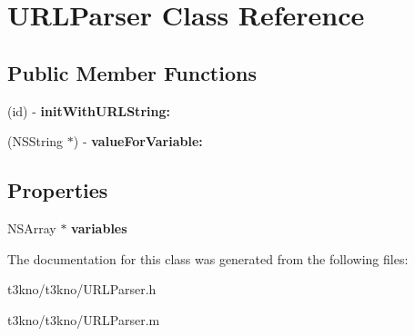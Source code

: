 \hypertarget{interface_u_r_l_parser}{\section{U\-R\-L\-Parser Class Reference}
\label{interface_u_r_l_parser}
}
\subsection*{Public Member Functions}
\begin{DoxyCompactItemize}
\item 
\hypertarget{interface_u_r_l_parser_a6e0ce77bf25aa5385addcae4a1017cc5}{(id) -\/ {\bfseries init\-With\-U\-R\-L\-String\-:}}\label{interface_u_r_l_parser_a6e0ce77bf25aa5385addcae4a1017cc5}

\item 
\hypertarget{interface_u_r_l_parser_a92bab5ca98064f17778700c746c48306}{(N\-S\-String $\ast$) -\/ {\bfseries value\-For\-Variable\-:}}\label{interface_u_r_l_parser_a92bab5ca98064f17778700c746c48306}

\end{DoxyCompactItemize}
\subsection*{Properties}
\begin{DoxyCompactItemize}
\item 
\hypertarget{interface_u_r_l_parser_aa09551532effe824ea18629d1d4b1a19}{N\-S\-Array $\ast$ {\bfseries variables}}\label{interface_u_r_l_parser_aa09551532effe824ea18629d1d4b1a19}

\end{DoxyCompactItemize}


The documentation for this class was generated from the following files\-:\begin{DoxyCompactItemize}
\item 
t3kno/t3kno/U\-R\-L\-Parser.\-h\item 
t3kno/t3kno/U\-R\-L\-Parser.\-m\end{DoxyCompactItemize}
